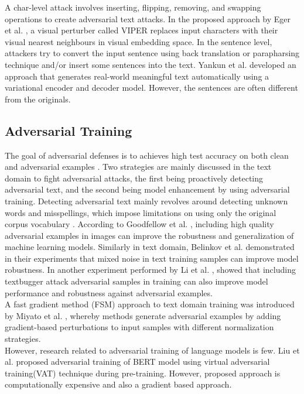 \documentclass[%
	BCOR=8mm, %
	DIV=12,
	toc=bibliography, %
	toc=listof, %
	oneside, %
	egregdoesnotlikesansseriftitles, %
	]{scrbook}
\begin{document}
A char-level attack involves inserting, flipping, removing, and swapping operations to create adversarial text attacks. In the proposed approach by Eger et al. \cite{eger_text_2019}, a visual perturber called VIPER replaces input characters with their visual nearest neighbours in visual embedding space.
In the sentence level, attackers try to convert the input sentence using back translation or parapharsing technique and/or  insert some sentences into the text. Yankun et al. \cite{ren_generating_2020}  developed an approach that generates real-world meaningful text automatically using a variational encoder and decoder model. However, the sentences are often different from the originals.

\subsection{Adversarial Training}
\label{subsection: adversarialtraining}
The goal of adversarial defenses is to achieves high test accuracy on both clean and adversarial examples \cite{zhou_defense_2020}. Two strategies are mainly discussed in the text domain to fight adversarial attacks, the first being proactively detecting adversarial text, and the second being model enhancement by using adversarial training. Detecting adversarial text mainly revolves around detecting unknown words and misspellings, which impose limitations on using only the original corpus vocabulary \cite{wang_towards_2021}. 
According to Goodfellow et al. \cite{goodfellow_explaining_2015}, including high quality adversarial examples in images can improve the robustness and generalization of machine learning models. Similarly in text domain, Belinkov et al.  \cite{belinkov_synthetic_2018} demonstrated in their experiments that mixed noise in text training samples can improve model robustness. In another experiment performed by Li et al. \cite{li_textbugger_2019}, showed that including textbugger attack adversarial samples in training can also improve model performance and robustness against adversarial examples.\\
A fast gradient method (FSM) approach to text domain training was introduced by Miyato et al. \cite{miyato_adversarial_2017}, whereby methods generate adversarial examples by adding gradient-based perturbations to input samples with different normalization strategies.\\
However, research related to adversarial training of language models is few. Liu et al. \cite{liu_adversarial_2020} proposed adversarial training of BERT model using virtual adversarial training(VAT) technique \cite{miyato_virtual_2018}  during pre-training. However, proposed approach is computationally expensive and also a gradient based approach.\\
\end{document}
